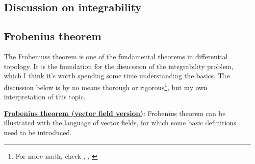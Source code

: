 \subsection{Discussion on integrability}\label{sssec:integrability}

\subsection{Frobenius theorem}\label{sssec:frobenius_theorem}
The Frobeniuss theorem is one of the fundamental theorems in differential topology. It is the foundation for the disucssion of the integrability problem, which I think it's worth spending some time understanding the basics. The discussion below is by no means thorough or rigorous\footnote{For more math, check \cite{sternberg1999lectures}, \cite{warner1983foundations}, \cite{mccleary2013geometry}}, but my own interpretation of this topic.

\underline{\textbf{Frobenius theorem (vector field version)}}: Frobenius theorem can be illustrated with the language of vector fields, for which some basic definitions need to be introduced.

